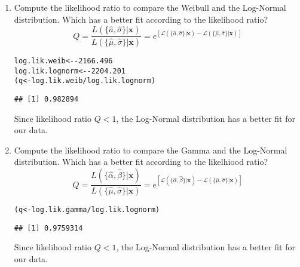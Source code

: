 \documentclass{article}\usepackage[]{graphicx}\usepackage[]{xcolor}
\makeatletter
\newcommand{\hlnum}[1]{\textcolor[rgb]{0.686,0.059,0.569}{#1}}%
\newcommand{\hlopt}[1]{\textcolor[rgb]{0,0,0}{#1}}%
\newcommand{\hldef}[1]{\textcolor[rgb]{0.345,0.345,0.345}{#1}}%
\newcommand{\hlkwb}[1]{\textcolor[rgb]{0.69,0.353,0.396}{#1}}%
\newenvironment{kframe}{%
 \def\at@end@of@kframe{}%
 \ifinner\ifhmode%
  \def\at@end@of@kframe{\end{minipage}}%
  \begin{minipage}{\columnwidth}%
 \fi\fi%
 \def\FrameCommand##1{\hskip\@totalleftmargin \hskip-\fboxsep
 \colorbox{shadecolor}{##1}\hskip-\fboxsep
     \hskip-\linewidth \hskip-\@totalleftmargin \hskip\columnwidth}%
 \MakeFramed {\advance\hsize-\width
   \@totalleftmargin\z@ \linewidth\hsize
   \@setminipage}}%
 {\par\unskip\endMakeFramed%
 \at@end@of@kframe}
\newenvironment{knitrout}{}{} %
\makeatother
\begin{document}
\begin{enumerate}
\begin{enumerate}
    \item Compute the likelihood ratio to compare the Weibull and the Log-Normal distribution.
    Which has a better fit according to the likelihood ratio?
    \[Q = \frac{L(\{\hat{a}, \hat{\sigma}\}|\mathbf{x})}{L(\{\hat{\mu}, \hat{\sigma}\}|\mathbf{x})}=e^{\left[\mathcal{L}(\{\hat{a}, \hat{\sigma}\}|\mathbf{x}) - \mathcal{L}(\{\hat{\mu}, \hat{\sigma}\}|\mathbf{x})\right]}\]
\begin{knitrout}\scriptsize
{}\color{fgcolor}\begin{kframe}
\begin{alltt}
\hldef{log.lik.weib} \hlkwb{<-} \hlopt{-}\hlnum{2166.496}
\hldef{log.lik.lognorm} \hlkwb{<-} \hlopt{-}\hlnum{2204.201}
\hldef{(q} \hlkwb{<-} \hldef{log.lik.weib} \hlopt{/} \hldef{log.lik.lognorm)}
\end{alltt}
\begin{verbatim}
## [1] 0.982894
\end{verbatim}
\end{kframe}
\end{knitrout}
  Since likelihood ratio $Q < 1$, the Log-Normal distribution has a better fit for our data. 
    \item Compute the likelihood ratio to compare the Gamma and the Log-Normal distribution.
    Which has a better fit according to the likelhiood ratio?
    \[Q = \frac{L(\{\hat{\alpha}, \hat{\beta}\}|\mathbf{x})}{L(\{\hat{\mu}, \hat{\sigma}\}|\mathbf{x})}=e^{\left[\mathcal{L}(\{\hat{\alpha}, \hat{\beta}\}|\mathbf{x}) - \mathcal{L}(\{\hat{\mu}, \hat{\sigma}\}|\mathbf{x})\right]}\]
\begin{knitrout}\scriptsize
{}\color{fgcolor}\begin{kframe}
\begin{alltt}
\hldef{(q} \hlkwb{<-} \hldef{log.lik.gamma} \hlopt{/} \hldef{log.lik.lognorm)}
\end{alltt}
\begin{verbatim}
## [1] 0.9759314
\end{verbatim}
\end{kframe}
\end{knitrout}
  Since likelihood ratio $Q < 1$, the Log-Normal distribution has a better fit for our data. 
    

\end{enumerate}
\end{enumerate}
\end{document}
